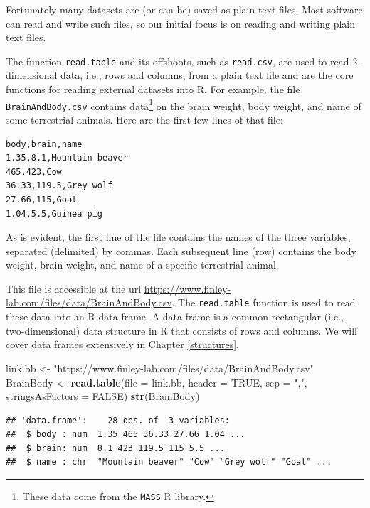 \documentclass[
]{krantz}
\newenvironment{Shaded}{\begin{snugshade}}{\end{snugshade}}
\newcommand{\DataTypeTok}[1]{\textcolor[rgb]{0.13,0.29,0.53}{#1}}
\newcommand{\KeywordTok}[1]{\textcolor[rgb]{0.13,0.29,0.53}{\textbf{#1}}}
\newcommand{\NormalTok}[1]{#1}
\newcommand{\OtherTok}[1]{\textcolor[rgb]{0.56,0.35,0.01}{#1}}
\newcommand{\StringTok}[1]{\textcolor[rgb]{0.31,0.60,0.02}{#1}}
\begin{document}
Fortunately many datasets are (or can be) saved as plain text files. Most software can read and write such files, so our initial focus is on reading and writing plain text files.

The function \texttt{read.table} and its offshoots, such as \texttt{read.csv}, are used to read 2-dimensional data, i.e., rows and columns, from a plain text file and are the core functions for reading external datasets into R. For example, the file \texttt{BrainAndBody.csv} contains data\footnote{These data come from the \texttt{MASS} R library.} on the brain weight, body weight, and name of some terrestrial animals. Here are the first few lines of that file:

\begin{verbatim}
body,brain,name
1.35,8.1,Mountain beaver
465,423,Cow
36.33,119.5,Grey wolf
27.66,115,Goat
1.04,5.5,Guinea pig
\end{verbatim}

As is evident, the first line of the file contains the names of the three variables, separated (delimited) by commas. Each subsequent line (row) contains the body weight, brain weight, and name of a specific terrestrial animal.

This file is accessible at the url \url{https://www.finley-lab.com/files/data/BrainAndBody.csv}. The \texttt{read.table} function is used to read these data into an R data frame. A data frame is a common rectangular (i.e., two-dimensional) data structure in R that consists of rows and columns. We will cover data frames extensively in Chapter \ref{structures}.

\begin{Shaded}
\begin{Highlighting}[]
\NormalTok{link.bb \textless{}{-}}\StringTok{ "https://www.finley{-}lab.com/files/data/BrainAndBody.csv"}
\NormalTok{BrainBody \textless{}{-}}\StringTok{ }\KeywordTok{read.table}\NormalTok{(}\DataTypeTok{file =}\NormalTok{ link.bb, }\DataTypeTok{header =} \OtherTok{TRUE}\NormalTok{, }\DataTypeTok{sep =} \StringTok{","}\NormalTok{, }
                        \DataTypeTok{stringsAsFactors =} \OtherTok{FALSE}\NormalTok{)}
\KeywordTok{str}\NormalTok{(BrainBody)}
\end{Highlighting}
\end{Shaded}

\begin{verbatim}
## 'data.frame':    28 obs. of  3 variables:
##  $ body : num  1.35 465 36.33 27.66 1.04 ...
##  $ brain: num  8.1 423 119.5 115 5.5 ...
##  $ name : chr  "Mountain beaver" "Cow" "Grey wolf" "Goat" ...
\end{verbatim}
\end{document}

